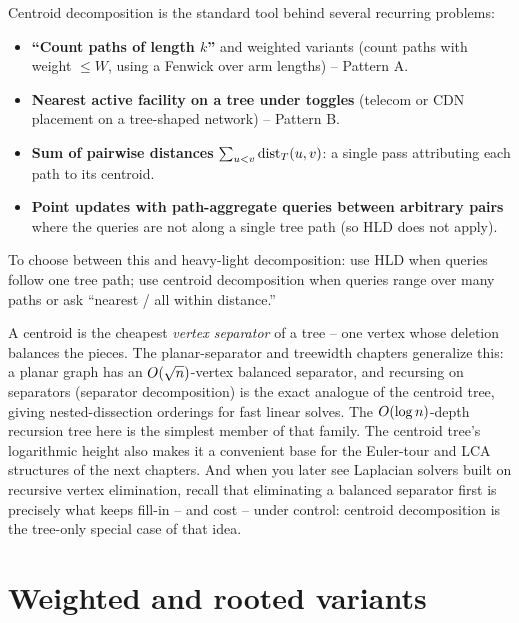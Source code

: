 \begin{applicationbox}
Centroid decomposition is the standard tool behind several recurring problems:
\begin{itemize}
  \item \textbf{``Count paths of length $k$''} and weighted variants (count paths
        with weight $\le W$, using a Fenwick over arm lengths) -- Pattern A.
  \item \textbf{Nearest active facility on a tree under toggles} (telecom or CDN
        placement on a tree-shaped network) -- Pattern B.
  \item \textbf{Sum of pairwise distances} $\sum_{u<v}\operatorname{dist}_T(u,v)$: a single
        pass attributing each path to its centroid.
  \item \textbf{Point updates with path-aggregate queries between arbitrary pairs}
        where the queries are not along a single tree path (so HLD does not apply).
\end{itemize}
To choose between this and heavy-light decomposition: use HLD when queries follow one
tree path; use centroid decomposition when queries range over many paths or ask
``nearest / all within distance.''
\end{applicationbox}

\begin{connectionbox}
A centroid is the cheapest \emph{vertex separator} of a tree -- one vertex whose
deletion balances the pieces. The planar-separator and treewidth chapters
generalize this: a planar graph has an $O(\sqrt n)$-vertex balanced separator,
and recursing on separators (separator decomposition) is the exact analogue of the
centroid tree, giving nested-dissection orderings for fast linear solves. The
$O(\log n)$-depth recursion tree here is the simplest member of that family. The
centroid tree's logarithmic height also makes it a convenient base for the
Euler-tour and LCA structures of the next chapters. And when you later see
Laplacian solvers built on recursive vertex elimination, recall that eliminating a
balanced separator first is precisely what keeps fill-in -- and cost -- under
control: centroid decomposition is the tree-only special case of that idea.
\end{connectionbox}

\section{Weighted and rooted variants}
\label{ch20:variants}

